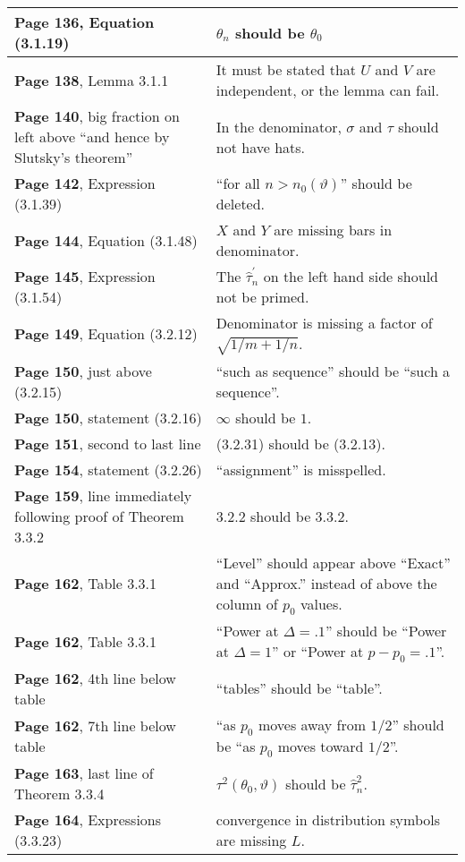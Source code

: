 \documentclass[10pt, a4paper]{article}
\begin{document}
\begin{longtable}{|R{.40\textwidth}|R{.55\textwidth}|}
\textbf{Page 136}, Equation (3.1.19) & $\theta_n$ should be $\theta_0$ \\ \hline
\textbf{Page 138}, Lemma 3.1.1 & It must be stated that $U$ and $V$ are independent, or the lemma can fail. \\ \hline
\textbf{Page 140}, big fraction on left above ``and hence by Slutsky's theorem'' & In the denominator, $\sigma$ and $\tau$ should not have hats. \\ \hline
\textbf{Page 142}, Expression (3.1.39) & ``for all $n > n_0(\vartheta)$'' should be deleted. \\ \hline
\textbf{Page 144}, Equation (3.1.48) & $X$ and $Y$ are missing bars in denominator. \\ \hline
\textbf{Page 145}, Expression (3.1.54) & The $\widehat{\tau}_n^\prime$ on the left hand side should not be primed. \\ \hline
\textbf{Page 149}, Equation (3.2.12) & Denominator is missing a factor of $\sqrt{1/m+1/n}$. \\ \hline
\textbf{Page 150}, just above (3.2.15) & ``such as sequence'' should be ``such a sequence''. \\ \hline
\textbf{Page 150}, statement (3.2.16) & $\infty$ should be $1$. \\ \hline
\textbf{Page 151}, second to last line & (3.2.31) should be (3.2.13). \\ \hline
\textbf{Page 154}, statement (3.2.26) & ``assignment'' is misspelled. \\ \hline
\textbf{Page 159}, line immediately following proof of Theorem 3.3.2 & 3.2.2 should be 3.3.2. \\ \hline
\textbf{Page 162}, Table 3.3.1 & ``Level'' should appear above ``Exact'' and ``Approx.'' instead of above the column of $p_0$ values. \\ \hline
\textbf{Page 162}, Table 3.3.1 & ``Power at $\Delta=.1$'' should be ``Power at $\Delta=1$'' or ``Power at $p-p_0=.1$''. \\ \hline
\textbf{Page 162}, 4th line below table & ``tables'' should be ``table''. \\ \hline
\textbf{Page 162}, 7th line below table & ``as $p_0$ moves away from $1/2$'' should be ``as $p_0$ moves toward $1/2$''. \\ \hline
\textbf{Page 163}, last line of Theorem 3.3.4 & $\tau^2(\theta_0, \vartheta)$ should be $\widehat{\tau}_n^2$. \\ \hline
\textbf{Page 164}, Expressions (3.3.23) & convergence in distribution symbols are missing $L$. \\ \hline

\end{longtable}
\end{document}
